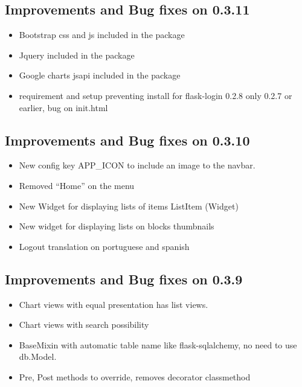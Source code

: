 \documentclass[letterpaper,10pt,english]{sphinxmanual}
\begin{document}
\subsection{Improvements and Bug fixes on 0.3.11}
\label{versions:improvements-and-bug-fixes-on-0-3-11}\begin{itemize}
\item {} 
Bootstrap css and js included in the package

\item {} 
Jquery included in the package

\item {} 
Google charts jsapi included in the package

\item {} 
requirement and setup preventing install for flask-login 0.2.8 only 0.2.7 or earlier, bug on init.html

\end{itemize}


\subsection{Improvements and Bug fixes on 0.3.10}
\label{versions:improvements-and-bug-fixes-on-0-3-10}\begin{itemize}
\item {} 
New config key APP\_ICON to include an image to the navbar.

\item {} 
Removed ``Home'' on the menu

\item {} 
New Widget for displaying lists of items ListItem (Widget)

\item {} 
New widget for displaying lists on blocks thumbnails

\item {} 
Logout translation on portuguese and spanish

\end{itemize}


\subsection{Improvements and Bug fixes on 0.3.9}
\label{versions:improvements-and-bug-fixes-on-0-3-9}\begin{itemize}
\item {} 
Chart views with equal presentation has list views.

\item {} 
Chart views with search possibility

\item {} 
BaseMixin with automatic table name like flask-sqlalchemy, no need to use db.Model.

\item {} 
Pre, Post methods to override, removes decorator classmethod

\end{itemize}
\end{document}
